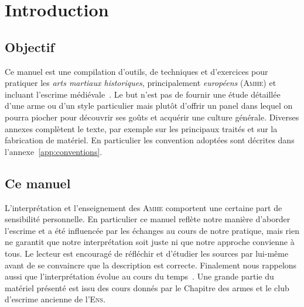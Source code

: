 \chapter{Introduction}


\section{Objectif}



Ce manuel est une compilation d'outils, de techniques et d'exercices pour pratiquer les \emph{arts martiaux historiques}, principalement \emph{européens} (\textsc{Amhe}) et incluant l'escrime médiévale~\footnotemark{}.
Le but n'est pas de fournir une étude détaillée d'une arme ou d'un style particulier mais plutôt d'offrir un panel dans lequel on pourra piocher pour découvrir ses goûts et acquérir une culture générale.
Diverses annexes complètent le texte, par exemple sur les principaux traités et sur la fabrication de matériel.
En particulier les convention adoptées sont décrites dans l'annexe~\ref{app:conventions}.


\section{Ce manuel}


L'interprétation et l'enseignement des \textsc{Amhe} comportent une certaine part de sensibilité personnelle.
En particulier ce manuel reflète notre manière d'aborder l'escrime et a été influencée par les échanges au cours de notre pratique, mais rien ne garantit que notre interprétation soit juste ni que notre approche convienne à tous.
Le lecteur est encouragé de réfléchir et d'étudier les sources par lui-même avant de se convaincre que la description est correcte.
Finalement nous rappelons aussi que l'interprétation évolue au cours du temps~\footnotemark{}.
Une grande partie du matériel présenté est issu des cours donnés par le Chapitre des armes et le club d'escrime ancienne de l'\textsc{Ens}.

